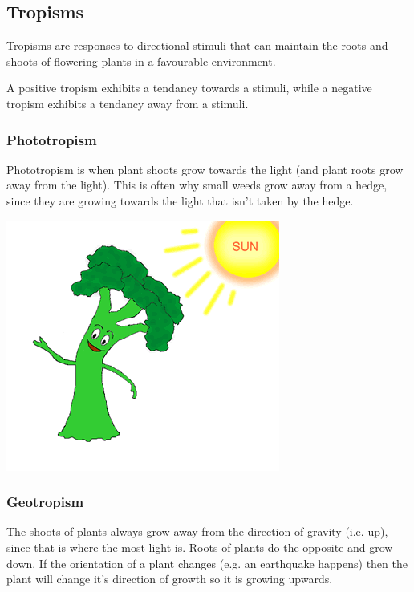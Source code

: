 \documentclass{article}
\begin{document}
\subsection*{Tropisms}

Tropisms are responses to directional stimuli that can maintain the roots and
shoots of flowering plants in a favourable environment.

A positive tropism exhibits a tendancy towards a stimuli, while a negative
tropism exhibits a tendancy away from a stimuli.

\subsubsection*{Phototropism}

Phototropism is when plant shoots grow towards the light (and plant roots grow
away from the light). This is often why small weeds grow away from a hedge,
since they are growing towards the light that isn't taken by the hedge.

\begin{center}
	\includegraphics[scale=0.5]{phototropism}
\end{center}

\subsubsection*{Geotropism}

The shoots of plants always grow away from the direction of gravity (i.e. up),
since that is where the most light is. Roots of plants do the opposite and grow
down. If the orientation of a plant changes (e.g. an earthquake happens) then
the plant will change it's direction of growth so it is growing upwards.
\end{document}
